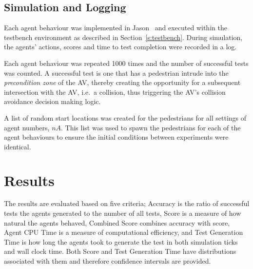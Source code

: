 \documentclass[letterpaper, 10 pt, journal, twoside]{IEEEtran}
\begin{document}



\subsection{Simulation and Logging}

Each agent behaviour was implemented in Jason~\cite{bordini2005jason} and executed within the testbench environment as described in Section~\ref{s:testbench}. During simulation, the agents' actions, scores and time to test completion were recorded in a log.

Each agent behaviour was repeated 1000 times and the number of successful tests was counted. A successful test is one that has a pedestrian intrude into the \textit{precondition zone} of the AV, thereby creating the opportunity for a subsequent intersection with the AV, i.e.\ a collision, thus triggering the AV's collision avoidance decision making logic.

A list of random start locations was created for the pedestrians for all settings of agent numbers, $nA$. This list was used to spawn the pedestrians for each of the agent behaviours to ensure the initial conditions between experiments were identical. 

\section{Results}\label{s:results}
The results are evaluated based on five criteria; Accuracy is the ratio of successful tests the agents generated to the number of all tests, Score is a measure of how natural the agents behaved, Combined Score combines accuracy with score, Agent CPU Time is a measure of computational efficiency, and Test Generation Time is how long the agents took to generate the test in both simulation ticks and wall clock time. Both Score and Test Generation Time have distributions associated with them and therefore confidence intervals are provided.


\end{document}

